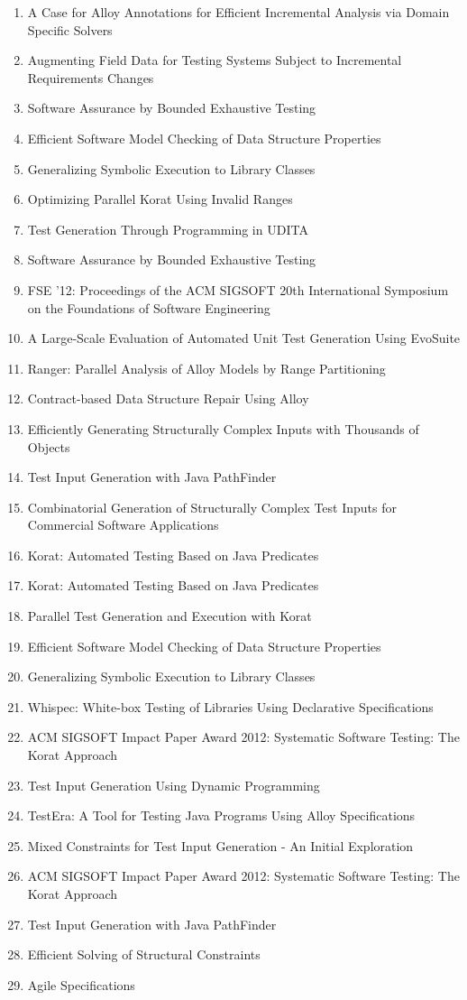 \begin{enumerate}
\item A Case for Alloy Annotations for Efficient Incremental Analysis via Domain Specific Solvers
\item Augmenting Field Data for Testing Systems Subject to Incremental Requirements Changes
\item Software Assurance by Bounded Exhaustive Testing
\item Efficient Software Model Checking of Data Structure Properties
\item Generalizing Symbolic Execution to Library Classes
\item Optimizing Parallel Korat Using Invalid Ranges
\item Test Generation Through Programming in UDITA
\item Software Assurance by Bounded Exhaustive Testing
\item FSE '12: Proceedings of the ACM SIGSOFT 20th International Symposium on the Foundations of Software Engineering
\item A Large-Scale Evaluation of Automated Unit Test Generation Using EvoSuite
\item Ranger: Parallel Analysis of Alloy Models by Range Partitioning
\item Contract-based Data Structure Repair Using Alloy
\item Efficiently Generating Structurally Complex Inputs with Thousands of Objects
\item Test Input Generation with Java PathFinder
\item Combinatorial Generation of Structurally Complex Test Inputs for Commercial Software Applications
\item Korat: Automated Testing Based on Java Predicates
\item Korat: Automated Testing Based on Java Predicates
\item Parallel Test Generation and Execution with Korat
\item Efficient Software Model Checking of Data Structure Properties
\item Generalizing Symbolic Execution to Library Classes
\item Whispec: White-box Testing of Libraries Using Declarative Specifications
\item ACM SIGSOFT Impact Paper Award 2012: Systematic Software Testing: The Korat Approach
\item Test Input Generation Using Dynamic Programming
\item TestEra: A Tool for Testing Java Programs Using Alloy Specifications
\item Mixed Constraints for Test Input Generation - An Initial Exploration
\item ACM SIGSOFT Impact Paper Award 2012: Systematic Software Testing: The Korat Approach
\item Test Input Generation with Java PathFinder
\item Efficient Solving of Structural Constraints
\item Agile Specifications
\end{enumerate}

